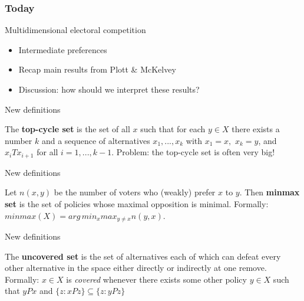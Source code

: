 \documentclass[11pt,aspectratio=169]{beamer}
\begin{document}
\begin{frame}

\frametitle{Today}

\Large

Multidimensional electoral competition

\large
 
\begin{itemize}
\item Intermediate preferences
\item Recap main results from Plott \& McKelvey
\item Discussion: how should we interpret these results?
\end{itemize}


\end{frame}
\begin{frame}{New definitions}

\begin{outline}
\1 The \textbf{top-cycle set} is the set of all $x$ such that for each $y \in X$ there exists a number $k$ and a sequence of alternatives $x_1, . . . , x_k$ with $x_1 = x, \, \,  x_k = y$, and $x_i T x_{i+1}$ for all $i = 1, . . . , k-1$.
\pause
\1 Problem: the top-cycle set is often very big!
\end{outline}

\end{frame}

\begin{frame}{New definitions}

\begin{outline}
\1 Let $n(x, y)$ be the number of voters who (weakly) prefer $x$ to $y$. 
\1 Then \textbf{minmax set} is the set of policies whose maximal opposition is minimal. Formally: $minmax(X) = arg \, min_x max_{y \neq x} n(y, x)$.
\end{outline}

\end{frame}

\begin{frame}{New definitions}

\begin{outline}
\1 The \textbf{uncovered set} is the set of alternatives each of which can defeat every other alternative in the space either directly or indirectly at one remove.
\1 Formally: $x \in X$ is \textit{covered} whenever there exists some other policy $y \in X$ such that $yPx$ and $\{ z: xPz \} \subseteq \{ z: yPz \}$
\end{outline}
\end{frame}
\end{document}
